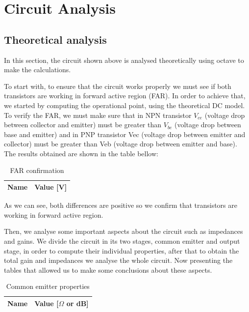 \newpage
\section{Circuit Analysis}
\label{sec:circuit}
\subsection{Theoretical analysis}
\label{sub:t1}

In this section, the circuit shown above is analysed theoretically using octave to make the calculations.

To start with, to ensure that the circuit works properly we must see if both transistors are working in forward active region (FAR). In order to achieve that, we started by 
computing the operational point, using the theoretical DC model. To verify the FAR, we must make sure that in NPN transistor $V_{ce}$ (voltage drop between collector and emitter)
must be greater than $V_{be}$ (voltage drop between base and emitter) and in PNP transistor Vec (voltage drop between emitter and collector) must be greater than Veb (voltage
drop between emitter and base).  
The results obtained are shown in the table bellow:

\begin{table}[h]
  \centering
  \begin{tabular}{|l|r|}
    \hline    
    {\bf Name} & {\bf Value [V]} \\ \hline
    
  \end{tabular}
  \caption{FAR confirmation}
  \label{tab:OP_Values}
\end{table}

As we can see, both differences are positive so we confirm that transistors are working in forward active region.

Then, we analyse some important aspects about the circuit such as impedances and gains. We divide the circuit in its two stages, common emitter and output stage, in order 
to compute their individual properties, after that to obtain the total gain and impedances we analyse the whole circuit.   
Now presenting the tables that allowed us to make some conclusions about these aspects.

\begin{table}[h]
  \centering
  \begin{tabular}{|l|r|}
    \hline    
    {\bf Name} & {\bf Value [{$\Omega$} or dB]} \\ \hline
    
  \end{tabular}
  \caption{Common emitter properties}
  \label{tab:1_Values}
\end{table}

